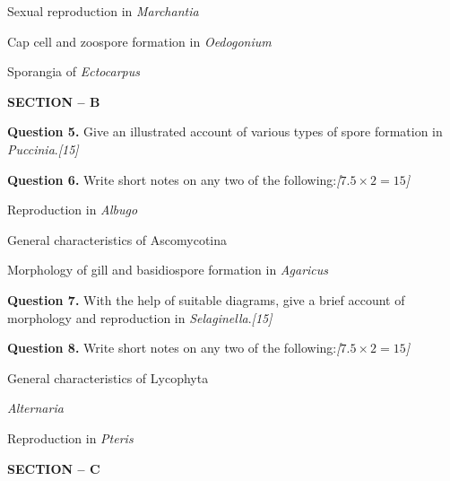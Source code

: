 \documentclass[11pt,a4paper]{article}
\newcommand{\pts}[1]{\hfill   \textit{[#1]}}
\begin{document}
\begin{parts}
  \item Sexual reproduction in   \textit{Marchantia}
  \item Cap cell and zoospore formation in   \textit{Oedogonium}
  \item Sporangia of   \textit{Ectocarpus}
\end{parts}

\bigskip

\begin{center}
   \textbf{SECTION -- B}
\end{center}

\medskip


\noindent   \textbf{Question 5.} Give an illustrated account of various types of spore formation in   \textit{Puccinia}.\pts{15}

\medskip


\noindent   \textbf{Question 6.} Write short notes on any two of the following:\pts{$7.5  \times 2 = 15$}

\begin{parts}
  \item Reproduction in   \textit{Albugo}
  \item General characteristics of Ascomycotina
  \item Morphology of gill and basidiospore formation in   \textit{Agaricus}
\end{parts}

\medskip


\noindent   \textbf{Question 7.} With the help of suitable diagrams, give a brief account of morphology and reproduction in   \textit{Selaginella}.\pts{15}

\medskip


\noindent   \textbf{Question 8.} Write short notes on any two of the following:\pts{$7.5  \times 2 = 15$}

\begin{parts}
  \item General characteristics of Lycophyta
  \item   \textit{Alternaria}
  \item Reproduction in   \textit{Pteris}
\end{parts}

\bigskip

\begin{center}
   \textbf{SECTION -- C}
\end{center}

\medskip
\end{document}
